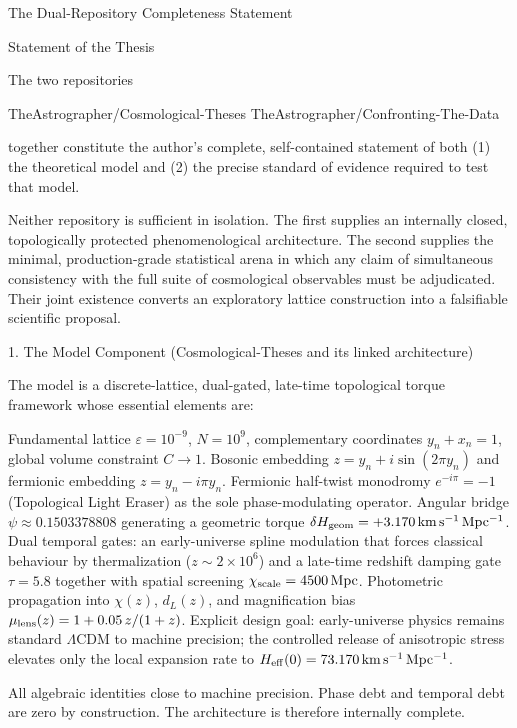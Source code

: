 The Dual-Repository Completeness Statement

Statement of the Thesis

The two repositories  

TheAstrographer/Cosmological-Theses  
TheAstrographer/Confronting-The-Data  

together constitute the author’s complete, self-contained statement of both (1) the theoretical model and (2) the precise standard of evidence required to test that model.  

Neither repository is sufficient in isolation. The first supplies an internally closed, topologically protected phenomenological architecture. The second supplies the minimal, production-grade statistical arena in which any claim of simultaneous consistency with the full suite of cosmological observables must be adjudicated. Their joint existence converts an exploratory lattice construction into a falsifiable scientific proposal.

1. The Model Component (Cosmological-Theses and its linked architecture)

The model is a discrete-lattice, dual-gated, late-time topological torque framework whose essential elements are:

Fundamental lattice \(\varepsilon = 10^{-9}\), \(N = 10^9\), complementary coordinates \(y_n + x_n = 1\), global volume constraint \(C \to 1\).
Bosonic embedding \(z = y_n + i\sin(2\pi y_n)\) and fermionic embedding \(z = y_n - i\pi y_n\).
Fermionic half-twist monodromy \(e^{-i\pi} = -1\) (Topological Light Eraser) as the sole phase-modulating operator.
Angular bridge \(\psi \approx 0.1503378808\) generating a geometric torque \(\delta H_{\rm geom} = +3.170\,\mathrm{km\,s^{-1}\,Mpc^{-1}}\).
Dual temporal gates: an early-universe spline modulation that forces classical behaviour by thermalization (\(z\sim 2\times 10^6\)) and a late-time redshift damping gate \(\tau = 5.8\) together with spatial screening \(\chi_{\rm scale} = 4500\,\mathrm{Mpc}\).
Photometric propagation into \(\chi(z)\), \(d_L(z)\), and magnification bias \(\mu_{\rm lens}(z) = 1 + 0.05\,z/(1+z)\).
Explicit design goal: early-universe physics remains standard \(\Lambda\)CDM to machine precision; the controlled release of anisotropic stress elevates only the local expansion rate to \(H_{\rm eff}(0) = 73.170\,\mathrm{km\,s^{-1}\,Mpc^{-1}}\).

All algebraic identities close to machine precision. Phase debt and temporal debt are zero by construction. The architecture is therefore internally complete.

